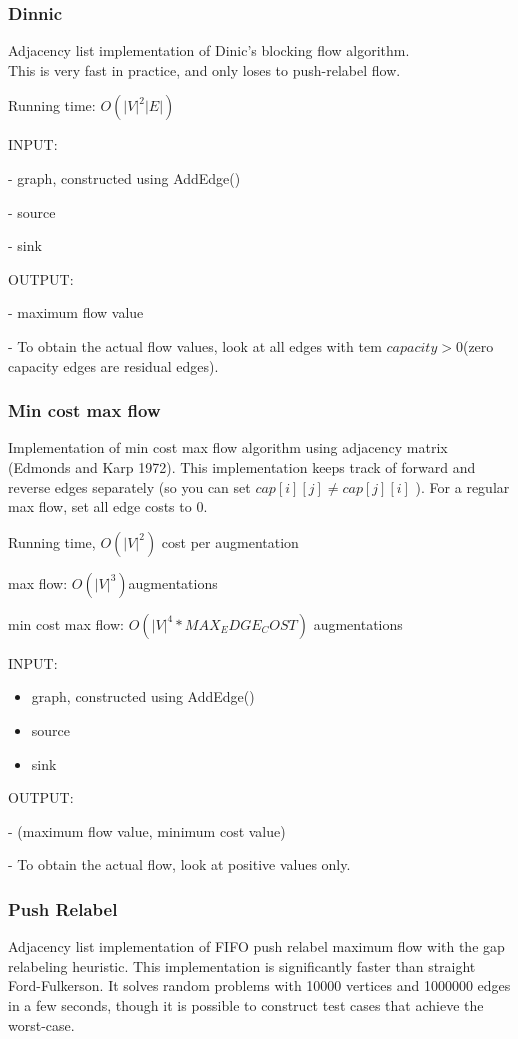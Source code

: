 \documentclass[10pt,letterpaper,twocolumn,twosided]{article}
\newcommand{\codigofuente}[1]{

\dotfill
}
\begin{document}
\subsubsection{Dinnic}
Adjacency list implementation of Dinic's blocking flow algorithm.\\
This is very fast in practice, and only loses to push-relabel flow.

Running time:
$ O(|V|^2 |E|) $

INPUT: 

-  graph, constructed using AddEdge()

- source

- sink



OUTPUT:

- maximum flow value

- To obtain the actual flow values, look at all edges with tem $ capacity > 0 $(zero capacity edges are residual edges).


\codigofuente{src/graphs/dinnic.cpp}


\subsubsection{Min cost max flow}
Implementation of min cost max flow algorithm using adjacency
matrix (Edmonds and Karp 1972). This implementation keeps track of
forward and reverse edges separately (so you can set $ cap[i][j] \ne cap[j][i]$ ). For a regular max flow, set all edge costs to 0.

Running time, $O(|V|^2)$ cost per augmentation 

max flow: $O(|V|^3) $augmentations 

min cost max flow: $O(|V|^4 * MAX_EDGE_COST)$ augmentations


INPUT: 
\begin{itemize}
\item graph, constructed using AddEdge()
\item source
\item sink
\end{itemize}

OUTPUT:

- (maximum flow value, minimum cost value)

- To obtain the actual flow, look at positive values only.

\codigofuente{src/graphs/mincostmaxflow.cpp}

\subsubsection{Push Relabel}
Adjacency list implementation of FIFO push relabel maximum flow
with the gap relabeling heuristic. This implementation is
significantly faster than straight Ford-Fulkerson. It solves
random problems with 10000 vertices and 1000000 edges in a few
seconds, though it is possible to construct test cases that
achieve the worst-case.
\end{document}
